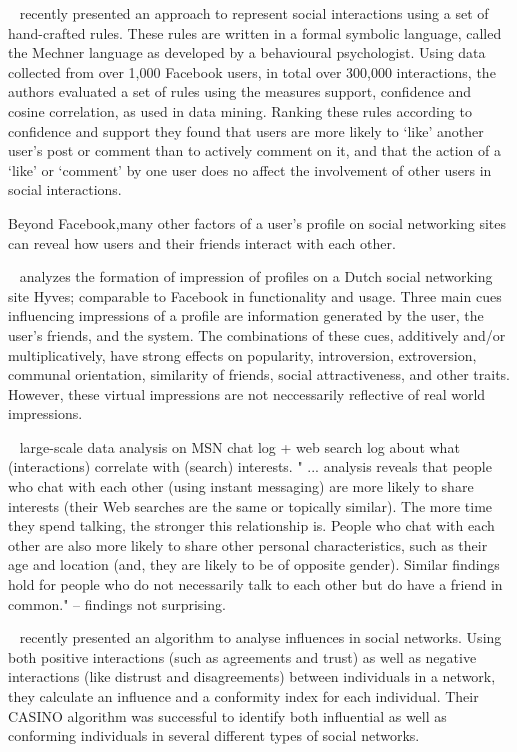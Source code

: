 \documentclass[letterpaper]{article}
\begin{document}
~\cite{gomes2011social} recently presented an approach to represent social interactions using a set of hand-crafted rules. These rules are written in a formal symbolic language, called the Mechner language as developed by a behavioural psychologist. Using data collected from over 1,000 Facebook users, in total over 300,000 interactions, the authors evaluated a set of rules using the measures support, confidence and cosine correlation, as used in data mining. Ranking these rules according to confidence and support they found that users are more likely to `like' another user's post or comment than to actively comment on it, and that the action of a `like' or `comment' by one user does no affect the involvement of other users in social interactions.






Beyond Facebook,many other factors of a user’s profile on social networking sites can reveal how users and their friends interact with each other.


~\cite{utz2010showme} analyzes the formation of impression of profiles on a Dutch social networking site Hyves; comparable to Facebook in functionality and usage. Three main cues influencing impressions of a profile are information generated by the user, the user’s friends, and the system. The combinations of these cues, additively and/or multiplicatively, have strong effects on popularity, introversion, extroversion, communal orientation, similarity of friends, social attractiveness, and other traits. However, these virtual impressions are not neccessarily reflective of real world impressions.


~\cite{singla2008yes} large-scale data analysis on MSN chat log + web search log about what (interactions) correlate with (search) interests.   " ... analysis reveals that people who chat with each other (using instant messaging) are more likely to share interests (their Web searches are the same or topically similar). The more time they spend talking, the stronger this relationship is. People who chat with each other are also more likely to share other personal characteristics, such as their age and location (and, they are likely to be of opposite gender). Similar findings hold for people who do not necessarily talk to each other but do have a friend in common." -- findings not surprising.


~\cite{li2011casino} recently presented an algorithm to analyse influences in social networks. Using both positive interactions (such as agreements and trust) as well as negative interactions (like distrust and disagreements) between individuals in a network, they calculate an influence and a conformity index for each individual. Their CASINO algorithm was successful to identify both influential as well as conforming individuals in several different types of social networks.
\end{document}

